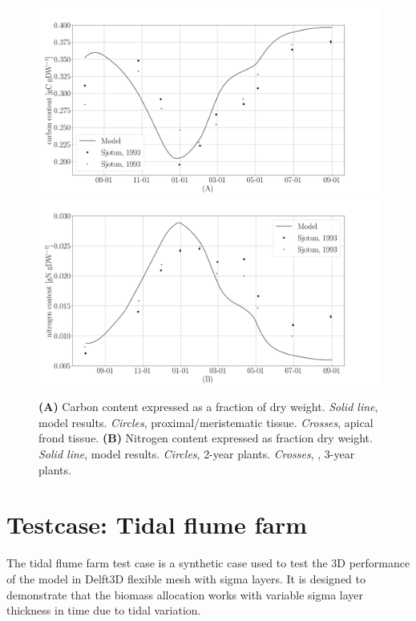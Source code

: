 \documentclass{deltares_manual}
\begin{document}
\begin{figure}[H]
	\centering
	\includegraphics[width=1\linewidth]{figures/carbon_storage}
	\includegraphics[width=1\linewidth]{figures/nitrogen_storage}
	\caption{\textbf{(A)} Carbon content expressed as a fraction of dry weight. \textit{Solid line}, model results. \textit{Circles}, \cite{sjotun1993} proximal/meristematic tissue. \textit{Crosses}, apical frond tissue. \textbf{(B)} Nitrogen content expressed as fraction dry weight. \textit{Solid line}, model results. \textit{Circles}, \cite{sjotun1993} 2-year plants. \textit{Crosses}, \cite{sjotun1993}, 3-year plants.}
	\label{fig:storage}
\end{figure}

\section{Testcase: Tidal flume farm}
The tidal flume farm test case is a synthetic case used to test the 3D performance of the model in Delft3D flexible mesh with sigma layers. It is designed to demonstrate that the biomass allocation works with variable sigma layer thickness in time due to tidal variation.
\end{document}

